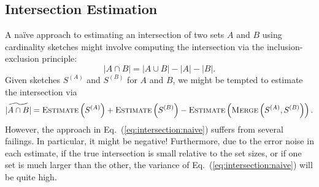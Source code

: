 \documentclass[10]{report}
\newcommand{\algoname}[1]{\textnormal{\textsc{#1}}}
\begin{document}
\subsection{Intersection Estimation}
 \label{DS:sec:HLL:intersection}

A na\"ive approach to estimating an intersection of two sets $A$ and $B$ using cardinality sketches might involve computing the intersection via the inclusion-exclusion principle:
%
\begin{equation} \label{eq:inclusion-exclusion}
	|A \cap B| = |A \cup B| - |A| - |B|.
\end{equation}
%
Given sketches $S^{(A)}$ and $S^{(B)}$ for $A$ and $B$, we might be tempted to estimate the intersection via
%
\begin{equation} \label{eq:intersection:naive}
	\widetilde{|A \cap B|} 
	= \algoname{Estimate} \left ( S^{(A)} \right ) 
	+ \algoname{Estimate} \left ( S^{(B)} \right ) 
	- \algoname{Estimate} \left ( \algoname{Merge} \left ( S^{(A)}, S^{(B)} \right ) \right ).
\end{equation}
%
However, the approach in Eq.~(\ref{eq:intersection:naive}) suffers from several failings.
In particular, it might be negative!
Furthermore, due to the error noise in each estimate, if the true intersection is small relative to the set sizes, or if one set is much larger than the other, the variance of Eq.~(\ref{eq:intersection:naive}) will be quite high.
\end{document}
